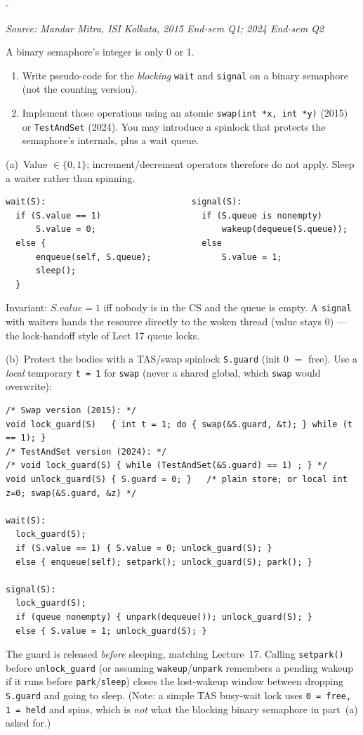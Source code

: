 \documentclass[11pt,a4paper]{article}
\makeatletter
\newcommand{\keepspace}[1]{\par\penalty-100\begingroup
  \setlength{\dimen@}{#1}\dimen@ii\pagegoal\advance\dimen@ii-\pagetotal
  \ifdim\dimen@>\dimen@ii\ifdim\dimen@ii>\z@\vfil\fi\break\fi\endgroup}
\newcounter{qn}[section]
\newenvironment{Qn}[4]{%
  \refstepcounter{qn}\keepspace{7\baselineskip}%
  \begin{tcolorbox}[qboxstyle, title={Q\thesection.\theqn\ \ [#1 \textbar\ #2]\ \ #4}]%
  {\footnotesize\color{g3}\textit{Source: #3}}\par\smallskip%
}{%
  \end{tcolorbox}%
}
\newenvironment{Sol}{%
  \begin{tcolorbox}[sboxstyle, title={Solution}]%
}{%
  \end{tcolorbox}\vspace{0.35em}%
}
\makeatother
\begin{document}
\begin{Qn}{Medium-Hard}{Lect 19}{Mandar Mitra, ISI Kolkata, 2015 End-sem Q1; 2024 End-sem Q2}{Blocking binary wait/signal, then with TAS / swap}
A binary semaphore's integer is only 0 or 1.

\begin{enumerate}
  \item[(a)] Write pseudo-code for the \emph{blocking} \texttt{wait} and
        \texttt{signal} on a binary semaphore (not the counting version).
  \item[(b)] Implement those operations using an atomic
        \texttt{swap(int *x, int *y)} (2015) or
        \texttt{TestAndSet} (2024). You may introduce a spinlock that
        protects the semaphore's internals, plus a wait queue.
\end{enumerate}
\end{Qn}
\begin{Sol}
(a)~Value $\in \{0,1\}$; increment/decrement operators therefore do not
apply. Sleep a waiter rather than spinning.
\begin{lstlisting}[numbers=none]
wait(S):                             signal(S):
  if (S.value == 1)                    if (S.queue is nonempty)
      S.value = 0;                         wakeup(dequeue(S.queue));
  else {                               else
      enqueue(self, S.queue);              S.value = 1;
      sleep();
  }
\end{lstlisting}
Invariant: $S.value = 1$ iff nobody is in the CS and the queue is
empty. A \texttt{signal} with waiters hands the resource directly to
the woken thread (value stays 0) --- the lock-handoff style of Lect 17
queue locks.

(b)~Protect the bodies with a TAS/swap spinlock \texttt{S.guard}
(init 0 $=$ free). Use a \emph{local} temporary \texttt{t = 1} for
\texttt{swap} (never a shared global, which \texttt{swap} would overwrite):
\begin{lstlisting}[numbers=none]
/* Swap version (2015): */
void lock_guard(S)   { int t = 1; do { swap(&S.guard, &t); } while (t == 1); }
/* TestAndSet version (2024): */
/* void lock_guard(S) { while (TestAndSet(&S.guard) == 1) ; } */
void unlock_guard(S) { S.guard = 0; }   /* plain store; or local int z=0; swap(&S.guard, &z) */

wait(S):
  lock_guard(S);
  if (S.value == 1) { S.value = 0; unlock_guard(S); }
  else { enqueue(self); setpark(); unlock_guard(S); park(); }

signal(S):
  lock_guard(S);
  if (queue nonempty) { unpark(dequeue()); unlock_guard(S); }
  else { S.value = 1; unlock_guard(S); }
\end{lstlisting}
The guard is released \emph{before} sleeping, matching Lecture~17. Calling
\texttt{setpark()} before \texttt{unlock\_guard} (or assuming
\texttt{wakeup}/\texttt{unpark} remembers a pending wakeup if it runs
before \texttt{park}/\texttt{sleep}) closes the lost-wakeup window between
dropping \texttt{S.guard} and going to sleep. (Note: a simple TAS busy-wait
lock uses \texttt{0 = free, 1 = held} and spins, which is \emph{not} what
the blocking binary semaphore in part~(a) asked for.)
\end{Sol}
\end{document}
